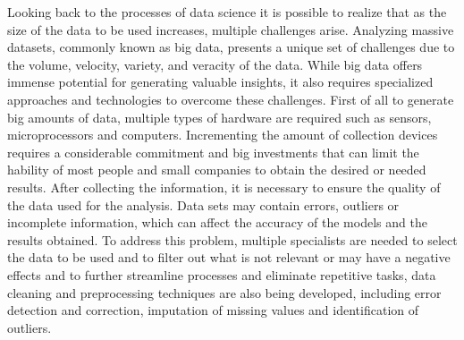 \documentclass{vgtc}                          %
\begin{document}
Looking back to the processes of data science it is possible to realize that as the size of the data to be used increases, multiple challenges arise.
Analyzing massive datasets, commonly known as big data, presents a unique set of challenges due to the volume, velocity, variety, and veracity of 
the data. While big data offers immense potential for generating valuable insights, it also requires specialized approaches and technologies to 
overcome these challenges. First of all to generate big amounts of data, multiple types of hardware are required such as sensors, microprocessors and computers. 
Incrementing the amount of collection devices requires a considerable commitment and big investments that can limit the hability of most people and small 
companies to obtain the desired or needed results. After collecting the information, it is necessary to ensure the quality of the data used for the analysis. Data 
sets may contain errors, outliers or incomplete information, which can affect the accuracy of the models and the results obtained. To address this problem, multiple 
specialists are needed to select the data to be used and to filter out what is not relevant or may have a negative effects and to further streamline processes and eliminate 
repetitive tasks, data cleaning and preprocessing techniques are also being developed, including error detection and correction, imputation of missing values and 
identification of outliers.\newline
\end{document}
